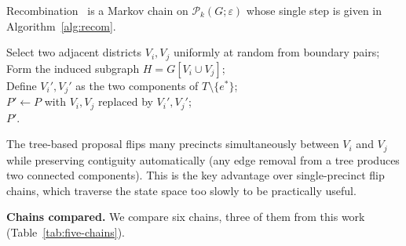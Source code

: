 \documentclass[11pt]{article}
\begin{document}
Recombination~\cite{deford2021recombination} is a Markov chain on
$\mathcal{P}_k(G; \varepsilon)$ whose single step is given in Algorithm~\ref{alg:recom}.

\begin{algorithm}[H]
\caption{Vanilla ReCom step (Chain V)}\label{alg:recom}
Select two adjacent districts $V_i, V_j$ uniformly at random from boundary pairs;\\
Form the induced subgraph $H = G[V_i \cup V_j]$;\\
Define $V_i', V_j'$ as the two components of $T \setminus \{e^*\}$;\\
$P' \gets P$ with $V_i, V_j$ replaced by $V_i', V_j'$;\\
\Return $P'$.
\end{algorithm}

\noindent The tree-based proposal flips many precincts simultaneously
between $V_i$ and $V_j$ while preserving contiguity automatically (any
edge removal from a tree produces two connected components). This is
the key advantage over single-precinct flip chains, which traverse the
state space too slowly to be practically useful.

\textbf{Chains compared.} We compare six chains, three of them from
this work (Table~\ref{tab:five-chains}).
\end{document}
